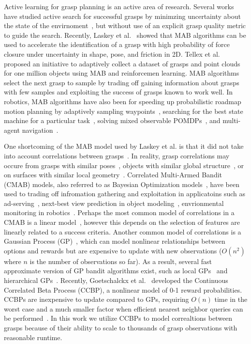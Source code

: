 Active learning for grasp planning is an active area of research.
Several works have studied active search for successful grasps by minimzing uncertainty about the state of the envirnoment~\cite{kahn, vincsze}, but without use of an explicit grasp quality metric to guide the search.
Recently, Laskey et al.~\cite{} showed that MAB algorithms can be used to accelerate the identification of a grasp with high probability of force closure under uncertainty in shape, pose, and friction in 2D.
Tellex et al.~\cite{} proposed an initiative to adaptively collect a dataset of grasps and point clouds for one million objects using MAB and reinforcemen learning.
MAB algorithms select the next grasp to sample by trading off gaining information about grasps with few samples and exploiting the success of grasps known to work well.
In robotics, MAB algorithms have also been for speeding up probabilistic roadmap motion planning by adaptively sampling waypoints~\cite{hsu2005hybrid}, searching for the best state machine for a particular task~\cite{matikainen2013multi}, solving mixed observable POMDPs~\cite{Mikko2015POMDP}, and multi-agent navigation~\cite{guy}.

One shortcoming of the MAB model used by Laskey et al. is that it did not take into account correlations between grasps~\cite{}.
In reality, grasp correlations may occure from grasps with similar poses~\cite{}, objects with similar global structure~\cite{}, or on surfaces with similar local geometry~\cite{}.
Correlated Multi-Armed Bandit (CMAB) models, also referred to as Bayesian Optimization models~\cite{}, have been used to trading off infromation gathering and exploitation in applicatoins such as ad-serving~\cite{}, next-best view prediction in object modeling~\cite{}, envrionmental monitoring in robotics~\cite{}.
Perhaps the most common model of correlations in a CMAB is a linear model~\cite{}, however this depends on the selection of features are linearly related to a success criteria.
Another common model of correlations is a Gaussian Process (GP)~\cite{}, which can model nonlinear relationships between options and rewards but are expensive to update with new observations ($O(n^2)$ where $n$ is the number of observations so far).
As a result, several fast approximate version of GP bandit algorithms exist, such as local GPs~\cite{} and hierarchical GPs~\cite{}.
Recently, Goetschalckx et al.~\cite{} developed the Continuous Correlated Beta Process (CCBP), a nonlinear model of 0-1 reward probabilities.
CCBPs are inexpensive to update compared to GPs, requiring $O(n)$ time in the worst case and a much smaller factor when efficient nearest neighbor queries can be performed~\cite{}.
In this work we utilize CCBPs to model correaltions between grasps because of their ability to scale to thousands of grasp observations with reasonable runtime.









